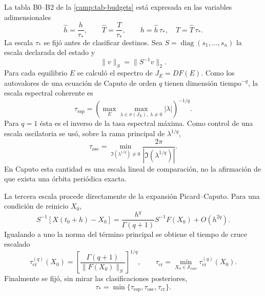 La tabla B0--B2 de la \cref{camp:tab-budgets} está expresada en las variables
adimensionales
\begin{equation}
 \widehat h=\frac{h}{\tau_*},\qquad
 \widehat T=\frac{T}{\tau_*},
 \qquad
 h=\widehat h\,\tau_*,\quad T=\widehat T\,\tau_*.
 \label{pilot:eq-budget-dimensionalization}
\end{equation}
La escala $\tau_*$ se fijó antes de clasificar destinos. Sea
$S=\operatorname{diag}(s_1,\ldots,s_n)$ la escala declarada del estado y
\begin{equation}
 \lVert v\rVert_S=\lVert S^{-1}v\rVert_2.
 \label{pilot:eq-scaled-norm}
\end{equation}
Para cada equilibrio $E$ se calculó el espectro de $J_E=DF(E)$. Como los
autovalores de una ecuación de Caputo de orden $q$ tienen dimensión
$\mathrm{tiempo}^{-q}$, la escala espectral coherente es
\begin{equation}
 \tau_{\mathrm{esp}}
 =\left(
   \max_{E}\max_{\lambda\in\sigma(J_E),\ \lambda\ne0}|\lambda|
  \right)^{-1/q}.
 \label{pilot:eq-tau-spectral}
\end{equation}
Para $q=1$ ésta es el inverso de la tasa espectral máxima. Como control de una
escala oscilatoria se usó, sobre la rama principal de $\lambda^{1/q}$,
\begin{equation}
 \tau_{\mathrm{osc}}
 =\min_{\Im(\lambda^{1/q})\ne0}
   \frac{2\pi}{|\Im(\lambda^{1/q})|}.
 \label{pilot:eq-tau-oscillatory}
\end{equation}
En Caputo esta cantidad es una escala lineal de comparación, no la afirmación
de que exista una órbita periódica exacta.

La tercera escala procede directamente de la expansión Picard--Caputo. Para
una condición de reinicio $X_0$,
\begin{equation}
 S^{-1}[X(t_0+h)-X_0]
 =\frac{h^q}{\Gamma(q+1)}S^{-1}F(X_0)+O(h^{2q}).
 \label{pilot:eq-scaled-picard-crossing}
\end{equation}
Igualando a uno la norma del término principal se obtiene el tiempo de cruce
escalado
\begin{equation}
 \tau_{\mathrm{cr}}^{(q)}(X_0)
 =\left[
   \frac{\Gamma(q+1)}{\lVert F(X_0)\rVert_S}
  \right]^{1/q},
 \qquad
 \tau_{\mathrm{cr}}
 =\min_{X_0\in\mathcal S_{\mathrm{core}}}
   \tau_{\mathrm{cr}}^{(q)}(X_0).
 \label{pilot:eq-tau-crossing}
\end{equation}
Finalmente se fijó, sin mirar las clasificaciones posteriores,
\begin{equation}
 \tau_*=\min\{\tau_{\mathrm{esp}},\tau_{\mathrm{osc}},
                    \tau_{\mathrm{cr}}\}.
 \label{pilot:eq-tau-star}
\end{equation}

